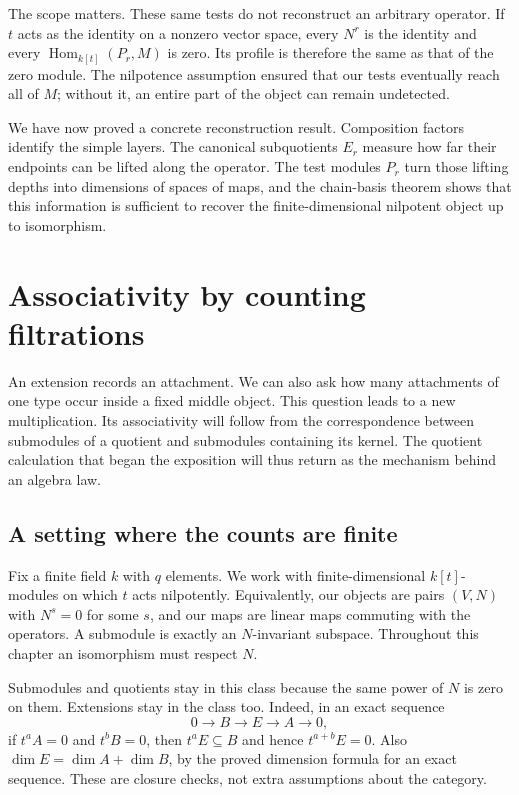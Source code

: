 \documentclass[11pt]{article}
\theoremstyle{definition}
\theoremstyle{remark}\newtheorem{remark}[theorem]{Remark}
\newcommand{\kk}{k}
\DeclareMathOperator{\Hom}{Hom}
\begin{document}
The scope matters. These same tests do not reconstruct an arbitrary
operator. If $t$ acts as the identity on a nonzero vector space, every
$N^r$ is the identity and every $\Hom_{k[t]}(P_r,M)$ is zero. Its profile
is therefore the same as that of the zero module. The nilpotence
assumption ensured that our tests eventually reach all of $M$; without
it, an entire part of the object can remain undetected.

We have now proved a concrete reconstruction result. Composition factors
identify the simple layers. The canonical subquotients $E_r$ measure how
far their endpoints can be lifted along the operator. The test modules
$P_r$ turn those lifting depths into dimensions of spaces of maps, and the
chain-basis theorem shows that this information is sufficient to recover
the finite-dimensional nilpotent object up to isomorphism.



\section{Associativity by counting filtrations}\label{hall:chapter}

An extension records an attachment. We can also ask how many attachments
of one type occur inside a fixed middle object. This question leads to a
new multiplication. Its associativity will follow from the correspondence
between submodules of a quotient and submodules containing its kernel.
The quotient calculation that began the exposition will thus return as
the mechanism behind an algebra law.

\subsection{A setting where the counts are finite}

Fix a finite field $\kk$ with $q$ elements. We work with finite-dimensional
$\kk[t]$-modules on which $t$ acts nilpotently. Equivalently, our objects
are pairs $(V,N)$ with $N^s=0$ for some $s$, and our maps are linear maps
commuting with the operators. A submodule is exactly an $N$-invariant
subspace. Throughout this chapter an isomorphism must respect $N$.

Submodules and quotients stay in this class because the same power of
$N$ is zero on them. Extensions stay in the class too. Indeed, in an
exact sequence
\[
0\longrightarrow B\longrightarrow E\longrightarrow A\longrightarrow0,
\]
if $t^aA=0$ and $t^bB=0$, then $t^aE\subseteq B$ and hence
$t^{a+b}E=0$. Also $\dim E=\dim A+\dim B$, by the proved dimension
formula for an exact sequence. These are closure checks, not extra
assumptions about the category.
\end{document}
